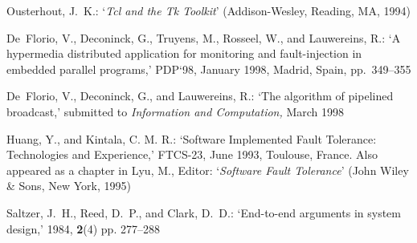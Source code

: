 \documentclass[11pt]{article}
\begin{document}
\begin{thebibliography}{20}
{\sc Ousterhout, J.~K.}:
\newblock `{\em Tcl and the Tk Toolkit}'
\newblock (Addison-Wesley, Reading, MA, 1994)

{\sc De~Florio, V., Deconinck, G., Truyens, M., Rosseel, W., and Lauwereins,
  R.}:
\newblock `A hypermedia distributed application for monitoring and
  fault-injection in embedded parallel programs,'
 PDP`98, January 1998, Madrid, Spain, pp.~349--355

{\sc De~Florio, V., Deconinck, G., and Lauwereins, R.}:
\newblock `The algorithm of pipelined broadcast,'
\newblock submitted to {\em Information and Computation,} March 1998

{\sc Huang, Y., and Kintala, C. M. R.}:
\newblock `Software Implemented Fault Tolerance:
Technologies and Experience,'
 FTCS-23, June 1993, Toulouse, France. Also
appeared as a chapter in {\sc Lyu, M.}, Editor: `\emph{Software Fault Tolerance}'
(John Wiley \& Sons, New York, 1995)

{\sc Saltzer, J.~H., Reed, D.~P., and Clark, D.~D.}:
\newblock `End-to-end arguments in system design,'
 1984, {\bf 2}(4) pp. 277--288
\end{thebibliography}

\vfill\eject

\appendix
\end{document}
